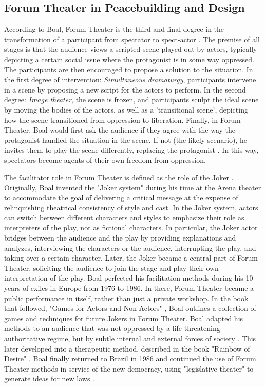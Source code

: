 \documentclass[dissertation,math,vertlayout,pdfa,colorlinks]{aaltoseries}
\begin{document}
\subsection{Forum Theater in Peacebuilding and Design}
According to Boal, Forum Theater is the third and final degree in the transformation of a participant from spectator to spect-actor \cite{boalTheatreOppressed2008}. The premise of all stages is that the audience views a scripted scene played out by actors, typically depicting a certain social issue where the protagonist is in some way oppressed. The participants are then encouraged to propose a solution to the situation. In the first degree of intervention: \textit{Simultaneous dramaturgy}, participants intervene in a scene by proposing a new script for the actors to perform. In the second degree: \textit{Image theater}, the scene is frozen, and participants sculpt the ideal scene by moving the bodies of the actors, as well as a 'transitional scene', depicting how the scene transitioned from oppression to liberation. Finally, in Forum Theater, Boal would first ask the audience if they agree with the way the protagonist handled the situation in the scene. If not (the likely scenario), he invites them to play the scene differently, replacing the protagonist \cite{friedmanPerformanceActivismPrecursors2021, cohen-cruzBoalCompanionDialogues2006}. In this way, spectators become agents of their own freedom from oppression. 

The facilitator role in Forum Theater is defined as the role of the Joker \cite{boalTheatreOppressed2008}. Originally, Boal invented the "Joker system" during his time at the Arena theater to accommodate the goal of delivering a critical message at the expense of relinquishing theatrical consistency of style and cast. In the Joker system, actors can switch between different characters and styles to emphasize their role as interpreters of the play, not as fictional characters. In particular, the Joker actor bridges between the audience and the play by providing explanations and analyzes, interviewing the characters or the audience, interrupting the play, and taking over a certain character. Later, the Joker became a central part of Forum Theater, soliciting the audience to join the stage and play their own interpretation of the play. Boal perfected his facilitation methods during his 10 years of exiles in Europe from 1976 to 1986. In there, Forum Theater became a public performance in itself, rather than just a private workshop. In the book that followed, "Games for Actors and Non-Actors" \cite{boalGamesActorsNonActors2021}, Boal outlines a collection of games and techniques for future Jokers in Forum Theater. Boal adapted his methods to an audience that was not oppressed by a life-threatening authoritative regime, but by subtle internal and external forces of society \cite{cohen-cruzBoalCompanionDialogues2006}. This later developed into a therapeutic method, described in the book "Rainbow of Desire" \cite{boalRainbowDesireBoal2013}. Boal finally returned to Brazil in 1986 and continued the use of Forum Theater methods in service of the new democracy, using "legislative theater" to generate ideas for new laws \cite{cohen-cruzBoalCompanionDialogues2006}.
\end{document}

